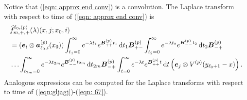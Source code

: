 Notice that (\ref{eqn: approx end conv}) is a convolution. The Laplace transform with respect to time of (\ref{eqn: approx end conv}) is
\begin{align}
	&\widehat f^{\ell_0,(p)}_{m,+,+}(\lambda)(x, j; x_0,i) \nonumber 
	\\&=(\boldsymbol e_i\otimes \boldsymbol  a_{\ell_0,i}^{(p)}(x_0))  \int_{t_1=0}^\infty e^{-\lambda t_1} e^{\boldsymbol{B}^{(p)}_{++}t_1} \, \mathrm{d} t_1 \boldsymbol{B}^{(p)}_{+{-}} \nonumber
	\int_{t_2=0}^\infty e^{-\lambda t_2} e^{\boldsymbol{B}^{(p)}_{--}t_2} \, \mathrm{d} t_2\boldsymbol{B}^{(p)}_{-{+}} 
	\\&\hdots 
	\int_{t_{2m}=0}^\infty e^{-\lambda t_{2m}}e^{\boldsymbol{B}^{(p)}_{--}t_{2m}} \, \mathrm{d} t_{2m}\boldsymbol{B}^{(p)}_{-{+}} 
	\int_{t=0}^\infty e^{-\lambda t}e^{\boldsymbol{B}^{(p)}_{++}t} \, \mathrm{d} t 
	\left(\boldsymbol e_j \otimes V^{(p)}(y_{\ell_0+1}-x)\right). \label{eqn: approx end conv lst}
\end{align}
Analogous expressions can be computed for the Laplace transforms with respect to time of (\ref{eqn:gljagj})-(\ref{eqn: 67}). 


